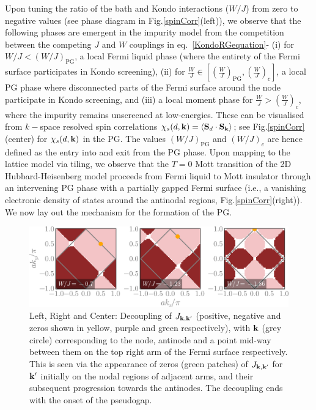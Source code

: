 \documentclass[%
 reprint,
superscriptaddress,
groupedaddress,
 amsmath,amssymb,
 aps,
prl,superscriptaddress
]{revtex4-2}
\begin{document}
Upon tuning the ratio of the bath and Kondo interactions ($W/J$) from zero to negative values (see phase diagram in Fig.\ref{spinCorr}(left)), we observe that the following phases are emergent in the impurity model from the competition between the competing $J$ and $W$ couplings in eq.~\eqref{KondoRGequation}- (i) for $W/J<(W/J)_{\text{PG}}$, a local Fermi liquid phase (where the entirety of the Fermi surface participates in Kondo screening), (ii) for $\frac{W}{J} \in [(\frac{W}{J})_{\text{PG}}, (\frac{W}{J})_c]$, a local PG phase where disconnected parts of the Fermi surface around the node participate in Kondo screening, and (iii) a local moment phase for $\frac{W}{J} > (\frac{W}{J})_c$, where the impurity remains unscreened at low-energies. These can be visualised from $k-$space resolved spin correlations $\chi_s(d,{\bf k}) = \braket{{\bf S}_d\cdot{\bf S}_{\bf k}}$; see Fig.\ref{spinCorr}(center) for $\chi_s(d,{\bf k})$ in the PG. The values $(W/J)_{\text{PG}}$ and $(W/J)_c$ are hence defined as the entry into and exit from the PG phase. Upon mapping to the lattice model via tiling, we observe that the $T=0$ Mott transition of the 2D Hubbard-Heisenberg model proceeds from Fermi liquid to Mott insulator through an intervening PG phase with a partially gapped Fermi surface (i.e., a vanishing electronic density of states around the antinodal regions, Fig.\ref{spinCorr}(right)). We now lay out the mechanism for the formation of the PG. 

\begin{figure}[htpb]
    \centering
    \includegraphics[width=\linewidth]{zerosFlow.pdf}
    \caption{Left, Right and Center: Decoupling of $J_{{\bf k}, {\bf k'}}$ (positive, negative and zeros shown in yellow, purple and green respectively), with ${\bf k}$ (grey circle) corresponding to the node, antinode and a point mid-way between them on the top right arm of the Fermi surface respectively. This is seen via the appearance of zeros (green patches) of $J_{{\bf k}, {\bf k'}}$ for ${\bf k'}$ initially on the nodal regions of adjacent arms, and their subsequent progression towards the antinodes. The decoupling 
    ends with the onset of the pseudogap.
    }
    \label{rgProgression}
\end{figure}
\end{document}
